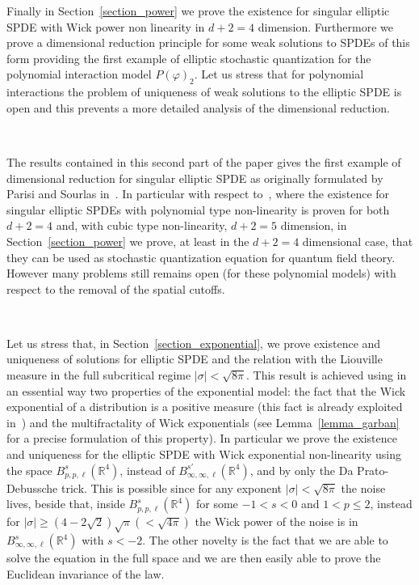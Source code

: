 \documentclass[a4paper,10pt]{article}
\begin{document}
Finally in Section~\ref{section_power} we prove the existence for singular
elliptic SPDE with Wick power non linearity in $d + 2 = 4$ dimension.
Furthermore we prove a dimensional reduction principle for some weak solutions
to SPDEs of this form providing the first example of elliptic stochastic
quantization for the polynomial interaction model $P (\varphi)_2$. Let us
stress that for polynomial interactions the problem of uniqueness of weak
solutions to the elliptic SPDE is open and this prevents a more detailed
analysis of the dimensional reduction.

\

The results contained in this second part of the paper gives the first
example of dimensional reduction for singular elliptic SPDE as originally
formulated by Parisi and Sourlas in~{\cite{parisi_random_1979}}. In particular
with respect to~{\cite{GH18}}, where the existence for singular elliptic SPDEs
with polynomial type non-linearity is proven for both $d + 2 = 4$ and, with
cubic type non-linearity, $d + 2 = 5$ dimension, in
Section~\ref{section_power} we prove, at least in the $d + 2 = 4$ dimensional
case, that they can be used as stochastic quantization equation for quantum
field theory. However many problems still remains open (for these polynomial models) with respect to the removal of the
spatial cutoffs.

\

Let us stress that, in Section~\ref{section_exponential}, we prove existence
and uniqueness of solutions for elliptic SPDE and the relation with the
Liouville measure in the full subcritical regime $| \sigma | < \sqrt{8 \pi}$.
This result is achieved using in an essential way two properties of the
exponential model: the fact that the Wick exponential of a distribution is a
positive measure (this fact is already exploited in~{\cite{Garban2018}}) and
the multifractality of Wick exponentials (see Lemma~\ref{lemma_garban} for a
precise formulation of this property). In particular we prove the existence
and uniqueness for the elliptic SPDE with Wick exponential non-linearity using
the space $B^s_{p, p, \ell} (\mathbb{R}^4)$, instead of $B^{s'}_{\infty,
\infty, \ell} (\mathbb{R}^4)$, and by only the Da Prato-Debussche trick. This
is possible since for any exponent $| \sigma | < \sqrt{8 \pi}$ the noise
lives, beside that, inside $B^s_{p, p, \ell} (\mathbb{R}^4)$ for some $- 1 < s
< 0$ and $1 < p \leqslant 2$, instead for $| \sigma | \geqslant \left( 4 - 2
\sqrt{2} \right) \sqrt{\pi} \left( < \sqrt{4 \pi} \right)$ the Wick power of
the noise is in $B^s_{\infty, \infty, \ell} (\mathbb{R}^4)$ with $s < - 2$.
The other novelty is the fact that we are able to solve the equation in the
full space and we are then easily able to prove the Euclidean invariance of
the law.
\end{document}
